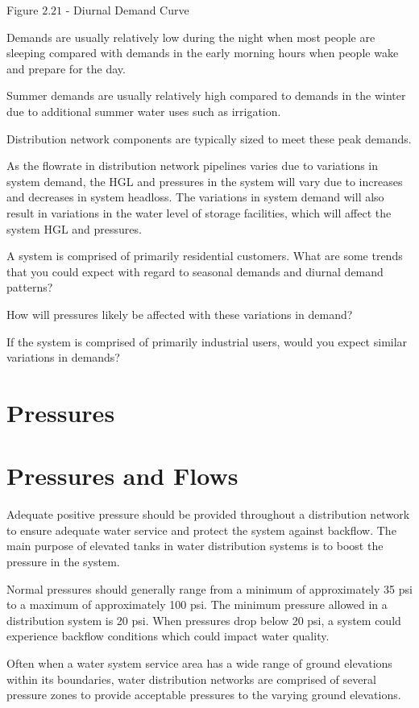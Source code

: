 \documentclass[10pt]{article}
\begin{document}
Figure $2.21$ - Diurnal Demand Curve

Demands are usually relatively low during the night when most people are sleeping compared with demands in the early morning hours when people wake and prepare for the day.

Summer demands are usually relatively high compared to demands in the winter due to additional summer water uses such as irrigation.

Distribution network components are typically sized to meet these peak demands.

As the flowrate in distribution network pipelines varies due to variations in system demand, the HGL and pressures in the system will vary due to increases and decreases in system headloss. The variations in system demand will also result in variations in the water level of storage facilities, which will affect the system $\mathrm{HGL}$ and pressures.

A system is comprised of primarily residential customers. What are some trends that you could expect with regard to seasonal demands and diurnal demand patterns?

How will pressures likely be affected with these variations in demand?

If the system is comprised of primarily industrial users, would you expect similar variations in demands?

\section{Pressures}
\section{Pressures and Flows}
Adequate positive pressure should be provided throughout a distribution network to ensure adequate water service and protect the system against backflow. The main purpose of elevated tanks in water distribution systems is to boost the pressure in the system.

Normal pressures should generally range from a minimum of approximately 35 psi to a maximum of approximately 100 psi. The minimum pressure allowed in a distribution system is 20 psi. When pressures drop below 20 psi, a system could experience backflow conditions which could impact water quality.

Often when a water system service area has a wide range of ground elevations within its boundaries, water distribution networks are comprised of several pressure zones to provide acceptable pressures to the varying ground elevations.
\end{document}
